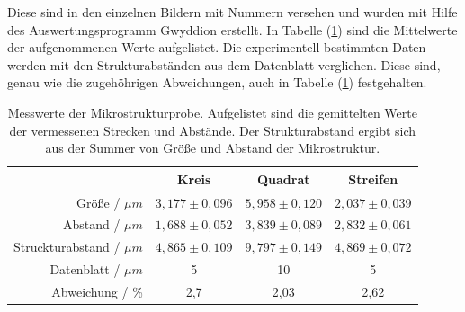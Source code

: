 %
Diese sind in den einzelnen Bildern mit Nummern versehen und wurden mit Hilfe des Auswertungsprogramm Gwyddion erstellt.
In Tabelle (\ref{tab:auf1}) sind die Mittelwerte der aufgenommenen Werte aufgelistet.
Die experimentell bestimmten Daten werden mit den Strukturabst\"anden aus dem Datenblatt \cite{sample} verglichen.
Diese sind, genau wie die zugeh\"ohrigen Abweichungen, auch in Tabelle (\ref{tab:auf1}) festgehalten.
\begin{table}
	\centering
	\caption{Messwerte der Mikrostrukturprobe. Aufgelistet sind die gemittelten Werte der vermessenen Strecken und Abst\"ande. Der Strukturabstand ergibt sich aus der Summer von Gr\"o{\ss}e und Abstand der Mikrostruktur.}
\begin{tabular}{|r|ccc|}
	\hline
	{} & {Kreis} & {Quadrat} & {Streifen} \\
	\hline
	Größe / $\mu m$ & $3,177 \pm 0,096$ & $5,958 \pm 0,120$ & $2,037 \pm 0,039$ \\
	Abstand / $\mu m$ & $1,688 \pm 0,052$ & $3,839 \pm 0,089$ & $2,832 \pm 0,061$ \\
	Struckturabstand / $\mu m$ & $4,865 \pm 0,109$ & $ 9,797 \pm 0,149$ & $4,869 \pm 0,072$ \\
	Datenblatt / $\mu m$ & 5 & 10 & 5 \\
	Abweichung / \%	& 2,7 & 2,03 & 2,62 \\
	\hline
\end{tabular}
\label{tab:auf1}
\end{table}


